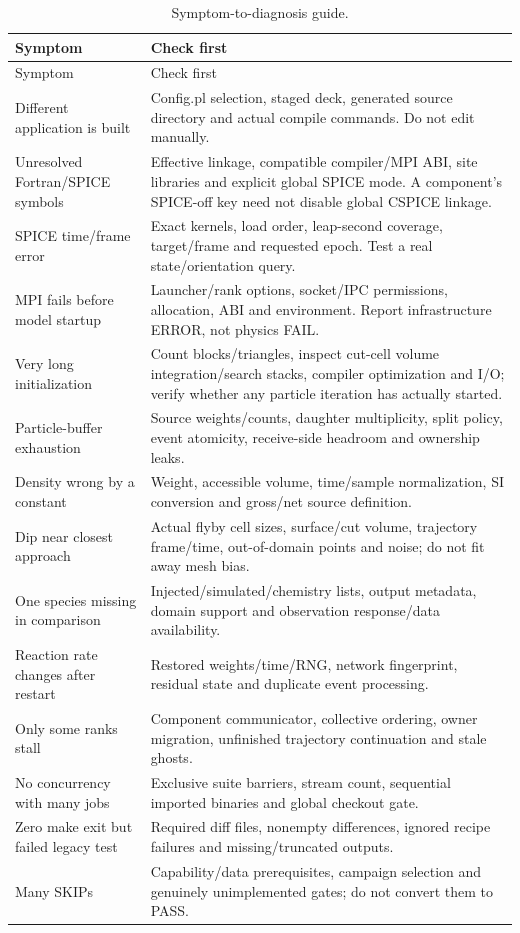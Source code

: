 \begin{longtable}{L{0.27\textwidth}L{0.63\textwidth}}
\caption{Symptom-to-diagnosis guide.}\\
\toprule Symptom & Check first\\\midrule\endfirsthead
\toprule Symptom & Check first\\\midrule\endhead
Different application is built & Config.pl selection, staged deck,
generated source directory and actual compile commands. Do not edit
 manually.\\
Unresolved Fortran/SPICE symbols & Effective linkage, compatible compiler/MPI
ABI, site libraries and explicit global SPICE mode. A component's SPICE-off
key need not disable global CSPICE linkage.\\
SPICE time/frame error & Exact kernels, load order, leap-second coverage,
target/frame and requested epoch. Test a real state/orientation query.\\
MPI fails before model startup & Launcher/rank options, socket/IPC permissions,
allocation, ABI and environment. Report infrastructure ERROR, not physics FAIL.\\
Very long initialization & Count blocks/triangles, inspect cut-cell volume
integration/search stacks, compiler optimization and I/O; verify whether any
particle iteration has actually started.\\
Particle-buffer exhaustion & Source weights/counts, daughter multiplicity,
split policy, event atomicity, receive-side headroom and ownership leaks.\\
Density wrong by a constant & Weight, accessible volume, time/sample
normalization, SI conversion and gross/net source definition.\\
Dip near closest approach & Actual flyby cell sizes, surface/cut volume,
trajectory frame/time, out-of-domain points and noise; do not fit away mesh bias.\\
One species missing in comparison & Injected/simulated/chemistry lists,
output metadata, domain support and observation response/data availability.\\
Reaction rate changes after restart & Restored weights/time/RNG, network
fingerprint, residual state and duplicate event processing.\\
Only some ranks stall & Component communicator, collective ordering,
owner migration, unfinished trajectory continuation and stale ghosts.\\
No concurrency with many jobs & Exclusive suite barriers, stream count,
sequential imported binaries and global checkout gate.\\
Zero make exit but failed legacy test & Required diff files, nonempty
differences, ignored recipe failures and missing/truncated outputs.\\
Many SKIPs & Capability/data prerequisites, campaign selection and genuinely
unimplemented gates; do not convert them to PASS.\\
\bottomrule
\end{longtable}

